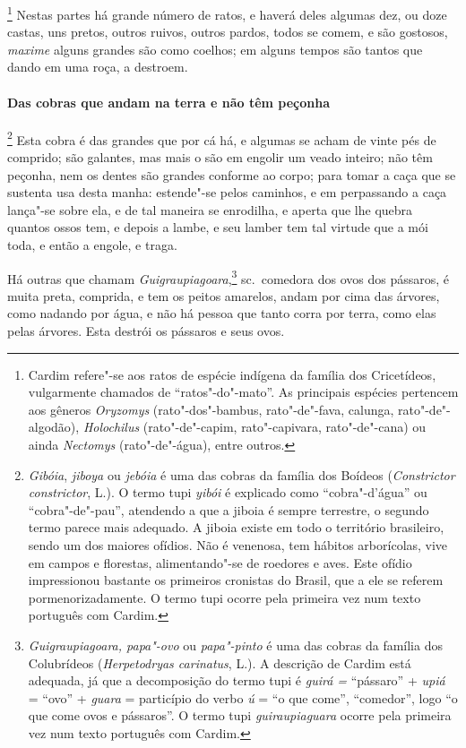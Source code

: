 \begin{linenumbers}
\footnote{ Cardim refere"-se aos ratos de espécie
indígena da família dos Cricetídeos, vulgarmente chamados de ``ratos"-do"-mato''. 
As principais espécies pertencem aos gêneros
\textit{Oryzomys} (rato"-dos"-bambus, rato"-de"-fava, calunga,
rato"-de"-algodão), \textit{Holochilus} (rato"-de"-capim, rato"-capivara,
rato"-de"-cana) ou ainda \textit{Nectomys} (rato"-de"-água), entre
outros.} Nestas partes há grande número de ratos, e
haverá deles algumas dez, ou doze castas, uns pretos, outros ruivos,
outros pardos, todos se comem, e são gostosos, \textit{maxime} alguns
grandes são como coelhos; em alguns tempos são tantos que dando em uma
roça, a destroem. 

\paragraph{Das cobras que andam na terra e não têm peçonha}\quad
{}\footnote{ \textit{Gibóia}, \textit{jiboya} ou 
\textit{jebóia} é uma das cobras da família dos Boídeos 
(\textit{Constrictor constrictor}, L.). O termo tupi \textit{yibói} é
explicado como ``cobra"-d'água'' ou ``cobra"-de"-pau'', atendendo a que a
jiboia é sempre terrestre, o segundo termo parece mais adequado. A
jiboia existe em todo o território brasileiro, sendo um dos maiores
ofídios. Não é venenosa, tem hábitos arborícolas, vive em campos e
florestas, alimentando"-se de roedores e aves. Este ofídio impressionou
bastante os primeiros cronistas do Brasil, que a ele se referem
pormenorizadamente. O termo tupi ocorre pela primeira vez num texto
português com Cardim.} Esta cobra é das grandes que por cá há,
e algumas se acham de vinte pés de comprido; são galantes, mas mais o
são em engolir um veado inteiro; não têm peçonha, nem os dentes são
grandes conforme ao corpo; para tomar a caça que se sustenta usa desta
manha: estende"-se pelos caminhos, e em perpassando a caça lança"-se
sobre ela, e de tal maneira se enrodilha, e aperta que lhe quebra
quantos ossos tem, e depois a lambe, e seu lamber tem tal virtude que a
mói toda, e então a engole, e traga. 

 Há outras que chamam \textit{Guigraupiagoara},\footnote{ \textit{Guigraupiagoara, 
papa"-ovo} ou \textit{papa"-pinto} é uma das
cobras da família dos Colubrídeos (\textit{Herpetodryas carinatus}, L.). 
A descrição de Cardim está adequada, já que a decomposição do
termo tupi é \textit{guirá =} ``pássaro'' + \textit{upiá} = ``ovo'' +
\textit{guara} = particípio do verbo \textit{ú} = ``o que come'',
``comedor'', logo ``o que come ovos e pássaros''. O termo tupi
\textit{guiraupiaguara} ocorre pela primeira vez num texto português
com Cardim.} sc.~comedora dos ovos dos pássaros, é muita preta,
comprida, e tem os peitos amarelos, andam por cima das árvores, como
nadando por água, e não há pessoa que tanto corra por terra, como elas
pelas árvores. Esta destrói os pássaros e seus ovos.


\end{linenumbers}
